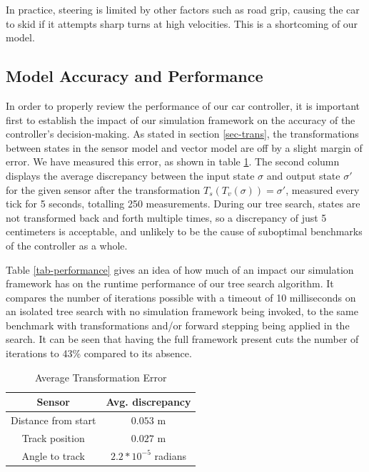 \documentclass[conference]{IEEEtran}
\begin{document}
In practice, steering is limited by other factors such as road grip, causing the car to skid if it attempts sharp turns at high velocities. This is a shortcoming of our model.

\subsection{Model Accuracy and Performance}
\label{sec-accuracy}

In order to properly review the performance of our car controller, it is important first to establish the impact of our simulation framework on the accuracy of the controller's decision-making. As stated in section \ref{sec-trans}, the transformations between states in the sensor model and vector model are off by a slight margin of error. We have measured this error, as shown in table \ref{tab-accuracy}. The second column displays the average discrepancy between the input state $\sigma$ and output state $\sigma'$ for the given sensor after the transformation $T_s(T_v(\sigma))=\sigma'$, measured every tick for 5 seconds, totalling 250 measurements. During our tree search, states are not transformed back and forth multiple times, so a discrepancy of just 5 centimeters is acceptable, and unlikely to be the cause of suboptimal benchmarks of the controller as a whole.

Table \ref{tab-performance} gives an idea of how much of an impact our simulation framework has on the runtime performance of our tree search algorithm. It compares the number of iterations possible with a timeout of 10 milliseconds on an isolated tree search with no simulation framework being invoked, to the same benchmark with transformations and/or forward stepping being applied in the search. It can be seen that having the full framework present cuts the number of iterations to 43\% compared to its absence.

\begin{table}
\begin{center}
\renewcommand{\arraystretch}{1.3}
\caption{Average Transformation Error}
\label{tab-accuracy}
\begin{tabular}{|c|c|} \hline
\textbf{Sensor} & \textbf{Avg. discrepancy} \\ \hline
Distance from start & $0.053$ m \\ \hline
Track position & $0.027$ m \\ \hline
Angle to track & $2.2*10^{-5}$ radians \\ \hline
\end{tabular}
\end{center}
\end{table}
\end{document}

